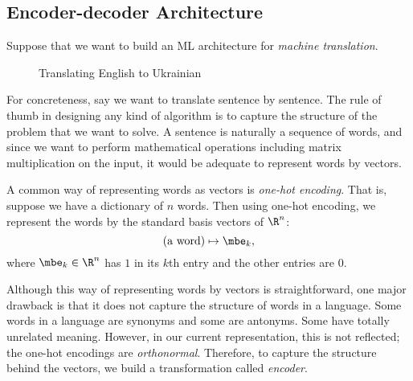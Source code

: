 \documentclass[11pt]{article}
\begin{document}
    \subsection{Encoder-decoder Architecture}

    Suppose that we want to build an ML architecture for \textit{machine translation}. 

    \begin{figure}[H]
        \center
            \begin{center}
            \end{center}
        \caption{Translating English to Ukrainian}
    \end{figure}

    \noindent For concreteness, say we want to translate sentence by sentence. The rule of thumb in designing any kind of algorithm is to capture the structure of the problem that we want to solve. A sentence is naturally a sequence of words, and since we want to perform mathematical operations including matrix multiplication on the input, it would be adequate to represent words by vectors. 
    
    A common way of representing words as vectors is \textit{one-hot encoding}. That is, suppose we have a dictionary of $n$ words. Then using one-hot encoding, we represent the words by the standard basis vectors of $\R^n$:
    \begin{equation}
        \text{(a word)} \mapsto \mbe_k ,
    \end{equation}
    where $\mbe_k\in\R^n$ has $1$ in its $k$th entry and the other entries are $0$.

    Although this way of representing words by vectors is straightforward, one major drawback is that it does not capture the structure of words in a language. Some words in a language are synonyms and some are antonyms. Some have totally unrelated meaning. However, in our current representation, this is not reflected; the one-hot encodings are \textit{orthonormal}. Therefore, to capture the structure behind the vectors, we build a transformation called \textit{encoder}.
       
\end{document}
